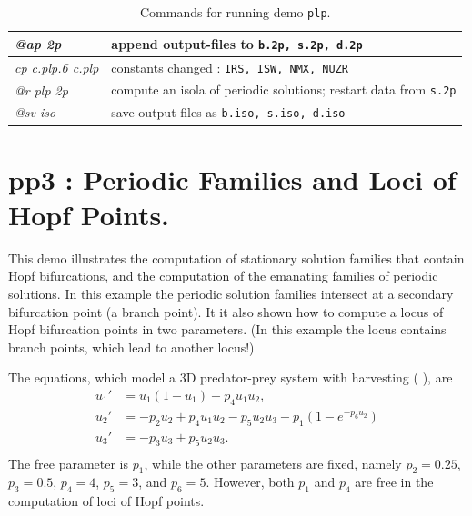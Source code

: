 \documentclass[12pt]{report}
\begin{document}
\begin{table}[htbp]
\begin{center}
\begin{tabular}{| l | l |}
  {\it @ap 2p} & append output-files to {\tt b.2p, s.2p, d.2p} \\ 
\hline
  {\it cp c.plp.6 c.plp} & constants changed : {\tt IRS, ISW, NMX, NUZR }\\ 
  {\it @r plp 2p} & compute an isola of periodic solutions; restart data from {\tt s.2p} \\ 
  {\it @sv iso} & save output-files as {\tt b.iso, s.iso, d.iso} \\ 
\hline
\end{tabular}
\caption{Commands for running demo {\tt plp}.}
\label{tbl:demo_plp}
\end{center}
\end{table}

\newpage
\section{ pp3 : Periodic Families and Loci of Hopf Points.} \label{sec:Demos_pp3}
This demo illustrates the computation of stationary solution families
that contain Hopf bifurcations, and the computation of the emanating
families of periodic solutions.  In this example the periodic 
solution families intersect at a secondary bifurcation point 
(a branch point). It it also shown how to compute a locus of Hopf bifurcation
points in two parameters. (In this example the locus contains branch points,
which lead to another locus!)

The equations, which model a 3D predator-prey system with harvesting
( \citeyear{Do:84}), are 
\begin{equation} \begin{array}{cl}
  u_1 ' &= u_1(1-u_1) - p_4 u_1 u_2  ,  \\
  u_2 ' &= -p_2 u_2 + p_4 u_1 u_2 - p_5 u_2 u_3
  -p_1(1-e^{-p_6 u_2}) \\
  u_3 ' &= -p_3 u_3  + p_5 u_2 u_3  .  \\\end{array} \end{equation}
The free parameter is $p_1$, while the other parameters are fixed,
namely $p_2=0.25$, $p_3=0.5$, $p_4=4$, $p_5=3$, and $p_6=5$.
However, both $p_1$ and $p_4$ are free in the computation of loci of Hopf points.
\end{document}
